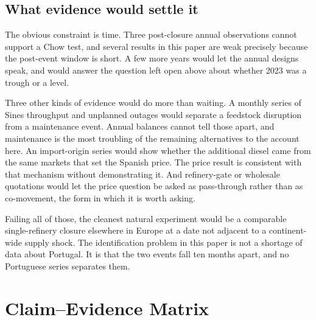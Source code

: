 \documentclass[11pt,a4paper]{article}
\begin{document}
\subsection{What evidence would settle it}

The obvious constraint is time. Three post-closure annual observations cannot support a Chow
test, and several results in this paper are weak precisely because the post-event window is
short. A few more years would let the annual designs speak, and would answer the question left
open above about whether 2023 was a trough or a level.

Three other kinds of evidence would do more than waiting. A monthly series of Sines throughput
and unplanned outages would separate a feedstock disruption from a maintenance event. Annual
balances cannot tell those apart, and maintenance is the most troubling of the remaining
alternatives to the account here. An import-origin series would show whether the additional
diesel came from the same markets that set the Spanish price. The price result is consistent
with that mechanism without demonstrating it. And refinery-gate or wholesale quotations would
let the price question be asked as pass-through rather than as co-movement, the form in which it
is worth asking.

Failing all of those, the cleanest natural experiment would be a comparable single-refinery
closure elsewhere in Europe at a date not adjacent to a continent-wide supply shock. The
identification problem in this paper is not a shortage of data about Portugal. It is that the
two events fall ten months apart, and no Portuguese series separates them.

\section*{Claim--Evidence Matrix}
\end{document}
